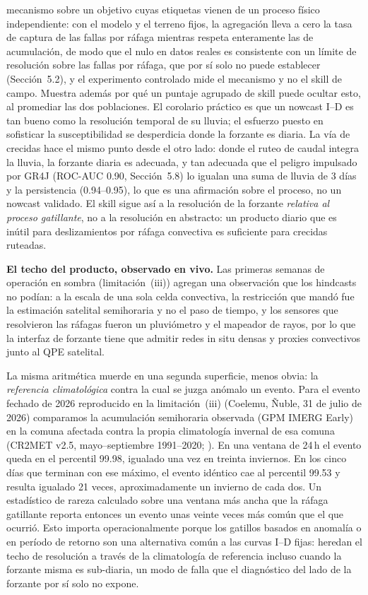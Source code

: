\documentclass[authoryear,preprint,review,12pt]{elsarticle}
\begin{document}
mecanismo sobre un objetivo cuyas etiquetas vienen de un proceso físico
independiente: con el modelo y el terreno fijos, la agregación lleva a cero la tasa
de captura de las fallas por ráfaga mientras respeta enteramente las de
acumulación, de modo que el nulo en datos reales es consistente con un límite de resolución sobre las fallas por ráfaga, que por sí solo no puede establecer (Sección~5.2), y el experimento controlado mide el mecanismo y no el skill de campo. Muestra además por
qué un puntaje agrupado de skill puede ocultar esto, al promediar las dos
poblaciones. El corolario práctico es que un nowcast I--D es tan bueno como la
resolución temporal de su lluvia; el esfuerzo puesto en sofisticar la
susceptibilidad se desperdicia donde la forzante es diaria. La vía de crecidas hace
el mismo punto desde el otro lado: donde el ruteo de caudal integra
la lluvia, la forzante diaria es adecuada, y tan adecuada que el peligro impulsado por GR4J (ROC-AUC 0.90, Sección~5.8) lo igualan una
suma de lluvia de 3 días y la persistencia (0.94--0.95), lo que es una afirmación sobre el proceso, no un nowcast validado. El skill sigue así a la resolución de
la forzante \emph{relativa al proceso gatillante}, no a la resolución en abstracto:
un producto diario que es inútil para deslizamientos por ráfaga convectiva es
suficiente para crecidas ruteadas.

\textbf{El techo del producto, observado en vivo.} Las primeras semanas de operación
en sombra (limitación~(iii)) agregan una observación que los hindcasts no podían: a la
escala de una sola celda convectiva, la restricción que mandó fue la estimación
satelital semihoraria y no el paso de tiempo, y los sensores que resolvieron las
ráfagas fueron un pluviómetro y el mapeador de rayos, por lo que la interfaz de
forzante tiene que admitir redes in situ densas y proxies convectivos junto al QPE
satelital.

La misma aritmética muerde en una segunda superficie, menos obvia: la
\emph{referencia climatológica} contra la cual se juzga anómalo un evento. Para el
evento fechado de 2026 reproducido en la limitación~(iii) (Coelemu, Ñuble, 31 de julio de 2026) comparamos la acumulación semihoraria
observada (GPM IMERG Early) en la comuna afectada contra la propia climatología invernal de esa
comuna (CR2MET v2.5, mayo--septiembre 1991--2020;
\citealp{boisier2018cr2met}). En una ventana de 24\,h el evento queda en el
percentil 99.98, igualado una vez en treinta inviernos. En los cinco días que
terminan con ese máximo, el evento idéntico cae al percentil 99.53 y resulta
igualado 21 veces, aproximadamente un invierno de cada dos. Un estadístico de
rareza calculado sobre una ventana más ancha que la ráfaga gatillante reporta
entonces un evento unas veinte veces más común que el que ocurrió. Esto importa operacionalmente porque los
gatillos basados en anomalía o en período de retorno son una alternativa común a
las curvas I--D fijas: heredan el techo de resolución a través de la climatología
de referencia incluso cuando la forzante misma es sub-diaria, un modo de falla que
el diagnóstico del lado de la forzante por sí solo no expone.
\end{document}
